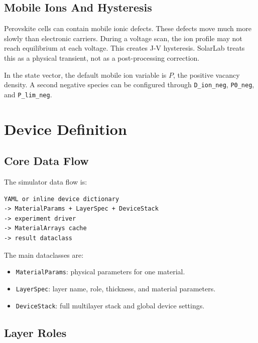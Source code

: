 \documentclass[
  11pt,
  american,
]{report}
\providecommand{\tightlist}{%
  \setlength{\itemsep}{0pt}\setlength{\parskip}{0pt}}
\begin{document}
\hypertarget{mobile-ions-and-hysteresis}{%
\section{Mobile Ions And Hysteresis}\label{mobile-ions-and-hysteresis}}

Perovskite cells can contain mobile ionic defects. These defects move
much more slowly than electronic carriers. During a voltage scan, the
ion profile may not reach equilibrium at each voltage. This creates J-V
hysteresis. SolarLab treats this as a physical transient, not as a
post-processing correction.

In the state vector, the default mobile ion variable is \(P\), the
positive vacancy density. A second negative species can be configured
through \texttt{D\_ion\_neg}, \texttt{P0\_neg}, and
\texttt{P\_lim\_neg}.

\hypertarget{device-definition}{%
\chapter{Device Definition}\label{device-definition}}

\hypertarget{core-data-flow}{%
\section{Core Data Flow}\label{core-data-flow}}

The simulator data flow is:

\begin{verbatim}
YAML or inline device dictionary
-> MaterialParams + LayerSpec + DeviceStack
-> experiment driver
-> MaterialArrays cache
-> result dataclass
\end{verbatim}

The main dataclasses are:

\begin{itemize}
\tightlist
\item
  \texttt{MaterialParams}: physical parameters for one material.
\item
  \texttt{LayerSpec}: layer name, role, thickness, and material
  parameters.
\item
  \texttt{DeviceStack}: full multilayer stack and global device
  settings.
\end{itemize}

\hypertarget{layer-roles}{%
\section{Layer Roles}\label{layer-roles}}
\end{document}
